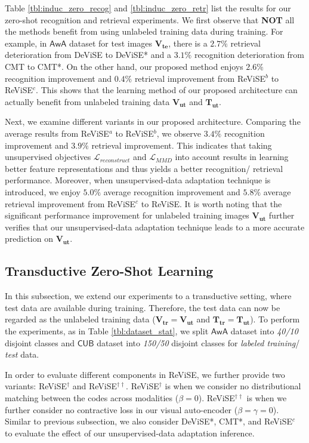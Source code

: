 {{	Table \ref{tbl:induc_zero_recog} and \ref{tbl:induc_zero_retr} list the results for our zero-shot recognition and retrieval experiments. We first observe that {\bf NOT} all the methods benefit from using unlabeled training data during training. For example, in $\mathsf{AwA}$ dataset for test images $\mathbf{V_{te}}$, there is a $2.7\%$ retrieval deterioration from DeViSE to DeViSE* and a $3.1\%$ recognition deterioration from CMT to CMT*. On the other hand, our proposed method enjoys $2.6\%$ recognition improvement and $0.4\%$ retrieval improvement from ReViSE$^b$ to ReViSE$^c$. This shows that the learning method of our proposed architecture can actually benefit from unlabeled training data $\mathbf{V_{ut}}$ and $\mathbf{T_{ut}}$. 

	Next, we examine different variants in our proposed architecture. Comparing the average results from ReViSE$^a$ to ReViSE$^b$, we observe $3.4\%$ recognition improvement and $3.9\%$ retrieval improvement. This indicates that taking unsupervised objectives $\mathcal{L}_{reconstruct}$ and $\mathcal{L}_{MMD}$ into account results in learning better feature representations and thus yields a better recognition/ retrieval performance. Moreover, when unsupervised-data adaptation technique is introduced, we enjoy $5.0\%$ average recognition improvement and $5.8\%$ average retrieval improvement from ReViSE$^c$ to ReViSE. It is worth noting that the significant performance improvement for unlabeled training images $\mathbf{V_{ut}}$ further verifies that our unsupervised-data adaptation technique leads to a more accurate prediction on $\mathbf{V_{ut}}$.
}

\subsection{Transductive Zero-Shot Learning}
\label{subsec:new_zero_learn}
{

	In this subsection, we extend our experiments to a transductive setting, where test data are available during training. Therefore, the test data can now be regarded as the unlabeled training data ($\mathbf{V_{tr}} = \mathbf{V_{ut}}$ and $\mathbf{T_{tr}} = \mathbf{T_{ut}}$). To perform the experiments, as in Table \ref{tbl:dataset_stat}, we split $\mathsf{AwA}$ dataset into {\em 40/10} disjoint classes and $\mathsf{CUB}$ dataset into {\em 150/50} disjoint classes for {\em labeled training}/ {\em test} data.


	In order to evaluate different components in ReViSE, we further provide two variants: ReViSE$^{\dagger}$ and ReViSE$^{\dagger\dagger}$. ReViSE$^{\dagger}$ is when we consider no distributional matching between the codes across modalities ($\beta = 0$). ReViSE$^{\dagger\dagger}$ is when we further consider no contractive loss in our visual auto-encoder ($\beta = \gamma = 0$). Similar to previous subsection, we also consider DeViSE*, CMT*, and ReViSE$^{c}$ to evaluate the effect of our unsupervised-data adaptation inference.





}}
